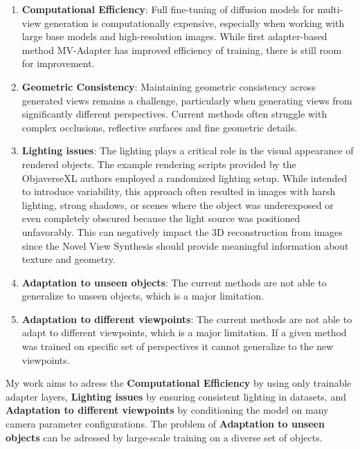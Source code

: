 \begin{enumerate}
  \item \textbf{Computational Efficiency}: Full fine-tuning of diffusion models for multi-view generation is computationally expensive, especially when working with large base models and high-resolution images. While first adapter-based method MV-Adapter has improved efficiency of training, there is still room for improvement.

  \item \textbf{Geometric Consistency}: Maintaining geometric consistency across generated views remains a challenge, particularly when generating views from significantly different perspectives. Current methods often struggle with complex occlusions, reflective surfaces and fine geometric details.

  \item \textbf{Lighting issues}: The lighting plays a critical role in the visual appearance of rendered objects. The example rendering scripts provided by the ObjaverseXL authors \cite{objaverse} employed a randomized lighting setup. While intended to introduce variability, this approach often resulted in images with harsh lighting, strong shadows, or scenes where the object was underexposed or even completely obscured because the light source was positioned unfavorably. This can negatively impact the 3D reconstruction from images since the Novel View Synthesis should provide meaningful information about texture and geometry.

  \item \textbf{Adaptation to unseen objects}: The current methods are not able to generalize to unseen objects, which is a major limitation.

  \item \textbf{Adaptation to different viewpoints}: The current methods are not able to adapt to different viewpoints, which is a major limitation. If a given method was trained on specific set of perspectives it cannot generalize to the new viewpoints.
\end{enumerate}

My work aims to adress the \textbf{Computational Efficiency} by using only trainable adapter layers, \textbf{Lighting issues} by ensuring consistent lighting in datasets, and \textbf{Adaptation to different viewpoints} by conditioning the model on many camera parameter configurations.
The problem of \textbf{Adaptation to unseen objects} can be adressed by large-scale training on a diverse set of objects.

